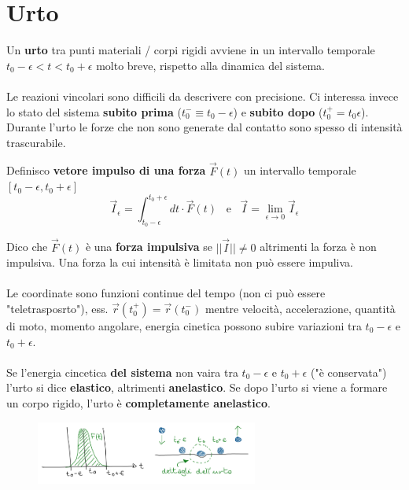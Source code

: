 \newpage
\section{Urto}
Un \textbf{urto} tra punti materiali / corpi rigidi avviene in un intervallo temporale 
$t_0 - \epsilon < t < t_0 + \epsilon$ molto breve, rispetto alla dinamica del sistema.\\\\
Le reazioni vincolari sono difficili da descrivere con precisione. Ci interessa invece lo stato del sistema \textbf{subito prima}
($t_0^- \equiv t_0 - \epsilon$) e \textbf{subito dopo} ($t_0^+ = t_0 \epsilon$). 
Durante l'urto le forze che non sono generate dal contatto sono spesso di intensità trascurabile.
\begin{definition}
    Definisco \textbf{vetore impulso di una forza} $\vec{F}(t)$ un intervallo temporale $[t_0 - \epsilon, t_0 + \epsilon]$
    $$\vec{I}_{\epsilon} = \int_{t_0 - \epsilon}^{t_0 + \epsilon}dt \cdot \vec{F}(t) \hspace{10pt} \text{e} \hspace{10pt}\vec{I} = \lim_{\epsilon\to 0}\vec{I}_{\epsilon}$$
\end{definition}
\hspace{-15pt}Dico che $\vec{F}(t)$ è una \textbf{forza impulsiva} se $||\vec{I}|| \neq 0$ altrimenti la forza è non impulsiva.
Una forza la cui intensità è limitata non può essere impuliva.\\\\
Le coordinate sono funzioni continue del tempo (non ci può essere "teletrasposrto"), ess. $\vec{r}(t_0^+) = \vec{r}(t_0^-)$ mentre
velocità, accelerazione, quantità di moto, momento angolare, energia cinetica possono subire variazioni tra $t_0 - \epsilon$ e $t_0 + \epsilon$.\\\\
Se l'energia cincetica \textbf{del sistema} non vaira tra $t_0 - \epsilon$ e $t_0 + \epsilon$ ("è conservata") l'urto si dice \textbf{elastico}, altrimenti \textbf{anelastico}.
Se dopo l'urto si viene a formare un corpo rigido, l'urto è \textbf{completamente anelastico}.
\begin{figure}[h!]
    \centering
    \includegraphics[width=0.65\textwidth]{images/vettore-impulso-forze.png}
\end{figure}

